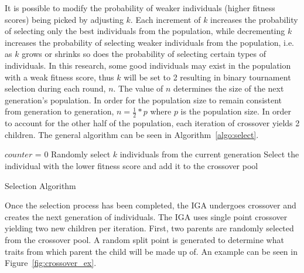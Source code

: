\documentclass[12pt]{article} %
\begin{document}
It is possible to modify the probability of weaker individuals (higher fitness scores) being picked by adjusting $k$. Each increment of $k$ increases the probability of selecting only the best individuals from the population, while decrementing $k$ increases the probability of selecting weaker individuals from the population, i.e. as $k$ grows or shrinks so does the probability of selecting certain types of individuals.  In this research, some good individuals may exist in the population with a weak fitness score, thus $k$ will be set to 2 resulting in binary tournament selection during each round, $n$. The value of $n$ determines the size of the next generation's population. In order for the population size to remain consistent from generation to generation, $n = \frac{1}{2} * p$ where $p$ is the population size. In order to account for the other half of the population, each iteration of crossover yields 2 children. The general algorithm can be seen in Algorithm~\ref{algo:select}.

\begin{algorithm}[H]
$counter$ = 0\;
 {
	Randomly select $k$ individuals from the current generation\;
	Select the individual with the lower fitness score and add it to the crossover pool\;
}
 \caption{Selection Algorithm}
\label{algo:select}
\end{algorithm}


Once the selection process has been completed, the IGA undergoes crossover and creates the next generation of individuals. The IGA uses single point crossover yielding two new children per iteration. First, two parents are randomly selected from the crossover pool. A random split point is generated to determine what traits from which parent the child will be made up of. An example can be seen in Figure~\ref{fig:crossover_ex}.
\end{document}

